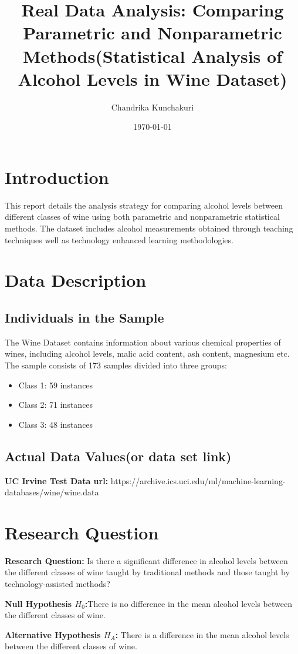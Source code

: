 \documentclass{article}
\title{Real Data Analysis: Comparing Parametric and Nonparametric Methods(Statistical Analysis of Alcohol Levels in
Wine Dataset)}
\author{Chandrika Kunchakuri}
\date{\today}
\begin{document}
\maketitle

\section{Introduction}
This report details the analysis strategy for comparing alcohol levels between different classes of wine using both parametric and nonparametric statistical methods. The dataset includes alcohol measurements obtained through teaching techniques well as technology enhanced learning methodologies.

\section{Data Description}
\subsection{Individuals in the Sample}
The Wine Dataset contains information about various chemical properties of wines, including alcohol levels, malic acid content, ash content, magnesium etc.
The sample consists of 173 samples divided into three groups:
\begin{itemize}
    \item Class 1: 59 instances 
    \item Class 2: 71 instances
    \item Class 3: 48 instances
\end{itemize}

\subsection{Actual Data Values(or data set link)}
\textbf{UC Irvine Test Data url:} https://archive.ics.uci.edu/ml/machine-learning-databases/wine/wine.data
\newpage
\section{Research Question}
\begin{flushleft}\textbf{Research Question:} Is there a significant difference in alcohol levels between the different classes of wine taught by traditional methods and those taught by technology-assisted methods?

\textbf{Null Hypothesis \( H_0 \):}There is no difference in the mean alcohol levels between the different classes of wine.

\textbf{Alternative Hypothesis \( H_A \):} There is a difference in the mean alcohol levels between the different classes of wine.

\end{flushleft}
\end{document}
